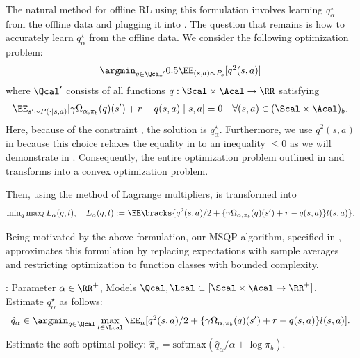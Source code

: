 The natural method for offline RL using this formulation involves learning $q^{\star}_{\alpha}$ from the offline data and plugging it into . The question that remains is how to accurately learn $q^{\star}_{\alpha}$ from the offline data. We consider the following optimization problem: 
\begin{align}\textstyle\label{eq:goal-pre}
    \argmin_{q \in \Qcal'} 0.5 \EE_{(s,a)\sim P_b}[q^2(s,a)]
\end{align} 
 where $\Qcal'$ consists of all functions $q: \Scal \times \Acal \to \RR$ satisfying 
 \begin{align}\label{eq:constraint1}
\EE_{s'\sim P(\cdot\mid s,a)}[\gamma \Omega_{\alpha,\pi_b}(q)(s')+r-q(s,a) \mid s,a ]=0~~~\forall (s,a)\in (\Scal \times \Acal)_b.
\end{align}
{ Here, because of the constraint , the solution is $q^{\star}_{\alpha}$. Furthermore, we use $q^2(s,a)$ in  because this choice relaxes the equality in  to an inequality $\leq 0$ as we will demonstrate in  . Consequently, the entire optimization problem outlined in  and  transforms into a convex optimization problem. } 


Then, using the method of Lagrange multipliers,  is transformed into 
\begin{align}\label{eq:goal}\textstyle
    \min_{q}\max_{l} L_{\alpha}(q,l),\quad L_{\alpha}(q,l):=
\EE\bracks{q^2(s,a)/2+ \{\gamma \Omega_{\alpha,\pi_b}(q)(s')+r-q(s,a)\}l(s,a)}. 
\end{align}














Being motivated by the above formulation, our MSQP algorithm, specified in , approximates this formulation by replacing expectations with sample averages and restricting optimization to function classes with bounded complexity.

\begin{algorithm}[!t]
\caption{MSQP (Minimax Soft-Q-learning with Penalization) }\label{alg:main}
\begin{algorithmic}[1]
  : Parameter $\alpha \in \RR^{+}$, Models $\Qcal,\Lcal \subset [\Scal \times \Acal \to \RR^{+}]$. 
    \STATE   Estimate $q^{\star}_{\alpha}$ as follows: 
    \begin{align}\label{eq:soft_q_objective}
        \hat q_{\alpha}\in \argmin_{q\in \Qcal}\max_{l\in \Lcal}\EE_n[q^2(s,a)/2+ %
        \{\gamma \Omega_{\alpha,\pi_b}(q)(s')+r-q(s,a)\}l(s,a)]. %
    \end{align}%
   \STATE Estimate the soft optimal policy: $
   \textstyle 
      \hat \pi_{\alpha}=\mathrm{softmax}(\hat q_{\alpha}/\alpha +\log \pi_b ). $
\end{algorithmic}
\end{algorithm}


